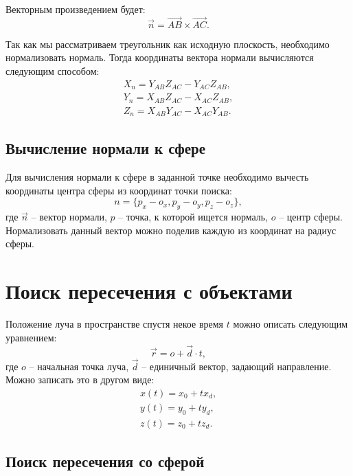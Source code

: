 Векторным произведением будет:
\begin{equation}
	\vec{n} = \vec{AB} \times \vec{AC}.
\end{equation}

Так как мы рассматриваем треугольник как исходную плоскость, необходимо нормализовать нормаль. Тогда координаты вектора нормали вычисляются следующим способом:
\begin{eqnarray}
	X_n = Y_{AB}Z_{AC} - Y_{AC}Z_{AB}, \\
	Y_n = X_{AB}Z_{AC} - X_{AC}Z_{AB}, \\
	Z_n = X_{AB}Y_{AC} - X_{AC}Y_{AB}.
\end{eqnarray}

\subsection{Вычисление нормали к сфере}

Для вычисления нормали к сфере в заданной точке необходимо вычесть координаты центра сферы из координат точки поиска:
\begin{equation}
	n = \{p_x - o_x, p_y - o_y, p_z - o_z\},
\end{equation}
где $\vec{n}$ -- вектор нормали, $p$ -- точка, к которой ищется нормаль, $o$ -- центр сферы. Нормализовать данный вектор можно поделив каждую из координат на радиус сферы.

\section{Поиск пересечения с объектами}

Положение луча в пространстве спустя некое время $t$ можно описать следующим уравнением:
\begin{equation}\label{r_o_d_t}
	\vec{r} = o + \vec{d} \cdot t,
\end{equation}
где $o$ -- начальная точка луча, $\vec{d}$ -- единичный вектор, задающий направление. Можно записать это в другом виде:
\begin{eqnarray}
	x(t) = x_0 + tx_d, \\
	y(t) = y_0 + ty_d, \\
	z(t) = z_0 + tz_d.
\end{eqnarray}

\subsection{Поиск пересечения со сферой}

